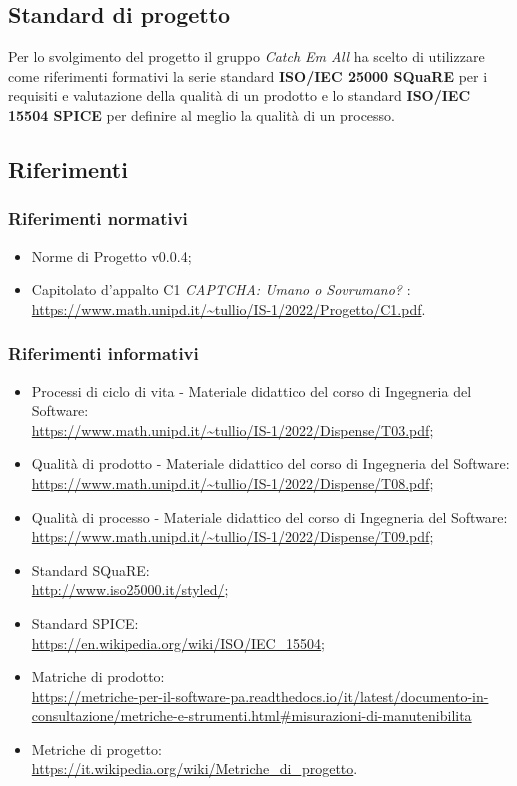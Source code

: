 \subsection{Standard di progetto}
Per lo svolgimento del progetto il gruppo \textit{Catch Em All} ha scelto di utilizzare come riferimenti formativi la serie standard \textbf{ISO/IEC 25000 SQuaRE} per i requisiti e valutazione della qualità di un prodotto e lo standard \textbf{ISO/IEC 15504 SPICE} per definire al meglio la qualità di un processo.

\subsection{Riferimenti}
\subsubsection{Riferimenti normativi}\:
\begin{itemize}
	\item Norme di Progetto v0.0.4;
	\item Capitolato d'appalto C1 \textit{CAPTCHA: Umano o Sovrumano?} : \\
		\url{https://www.math.unipd.it/~tullio/IS-1/2022/Progetto/C1.pdf}.
\end{itemize}
	
\subsubsection{Riferimenti informativi}\:
\begin{itemize}
	\item Processi di ciclo di vita - Materiale didattico del corso di Ingegneria del Software: \\
		\url{https://www.math.unipd.it/~tullio/IS-1/2022/Dispense/T03.pdf};
	\item Qualità di prodotto - Materiale didattico del corso di Ingegneria del Software: \\
		\url{https://www.math.unipd.it/~tullio/IS-1/2022/Dispense/T08.pdf};
	\item Qualità di processo - Materiale didattico del corso di Ingegneria del Software: \\
		\url{https://www.math.unipd.it/~tullio/IS-1/2022/Dispense/T09.pdf};
	\item Standard SQuaRE: \\
		\url{http://www.iso25000.it/styled/};
	\item Standard SPICE: \\
		\url{https://en.wikipedia.org/wiki/ISO/IEC_15504};
	\item Matriche di prodotto: \\
		\url{https://metriche-per-il-software-pa.readthedocs.io/it/latest/documento-in-consultazione/metriche-e-strumenti.html#misurazioni-di-manutenibilita}
	\item Metriche di progetto: \\
		\url{https://it.wikipedia.org/wiki/Metriche_di_progetto}.
\end{itemize}

